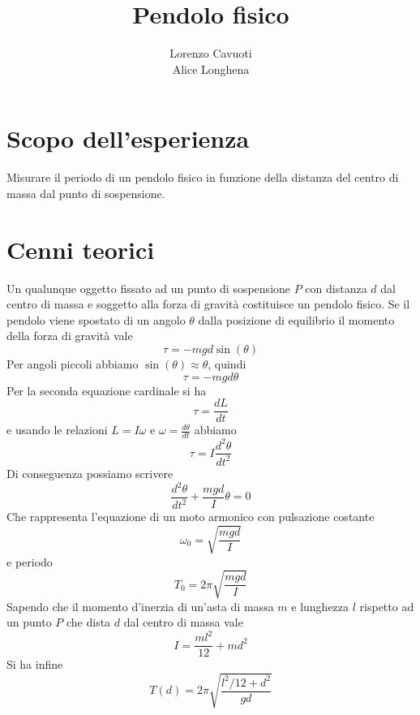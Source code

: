 \documentclass{article}
\title{Pendolo fisico}
\author{Lorenzo Cavuoti \\ Alice Longhena}
\begin{document}
	\maketitle
	
	\section{Scopo dell'esperienza}
		Misurare il periodo di un pendolo fisico in funzione della distanza del centro di massa dal punto di sospensione.
		
	\section{Cenni teorici}
		Un qualunque oggetto fissato ad un punto di sospensione $P$ con distanza $d$ dal centro di massa e soggetto alla forza di gravit\`{a} costituisce un pendolo fisico. Se il pendolo viene spostato di un angolo $\theta$ dalla posizione di equilibrio il momento della forza di gravit\`{a} vale
		\begin{equation}
			\tau = -mgd\sin(\theta)
		\end{equation}
		Per angoli piccoli abbiamo $\sin(\theta) \approx \theta$, quindi
		\begin{equation}
			\tau = -mgd\theta
		\end{equation}
		Per la seconda equazione cardinale si ha
		\begin{equation}
			\tau = \frac{dL}{dt}
		\end{equation}
		e usando le relazioni $L = I\omega$ e $\omega = \frac{d\theta}{dt}$ abbiamo
		\begin{equation}
			\tau = I\frac{d^2\theta}{dt^2}
		\end{equation}
		Di conseguenza possiamo scrivere
		\begin{equation}
			\frac{d^2\theta}{dt^2} + \frac{mgd}{I}\theta = 0
		\end{equation}
		Che rappresenta l'equazione di un moto armonico con pulsazione costante
		\begin{equation}
			\omega_0 = \sqrt{\frac{mgd}{I}}
		\end{equation}
		e periodo
		\begin{equation}
			T_0 = 2\pi\sqrt{\frac{mgd}{I}}
		\end{equation}
		Sapendo che il momento d'inerzia di un'asta di massa $m$ e lunghezza $l$ rispetto ad un punto $P$ che dista $d$ dal centro di massa vale
		\begin{equation}
			I = \frac{ml^2}{12}+md^2
		\end{equation}
		Si ha infine
		\begin{equation}
			T(d) = 2\pi\sqrt{\frac{l^2/12+d^2}{gd}}
			\label{Periodo pendolo fisico}
		\end{equation}
		
\end{document}
